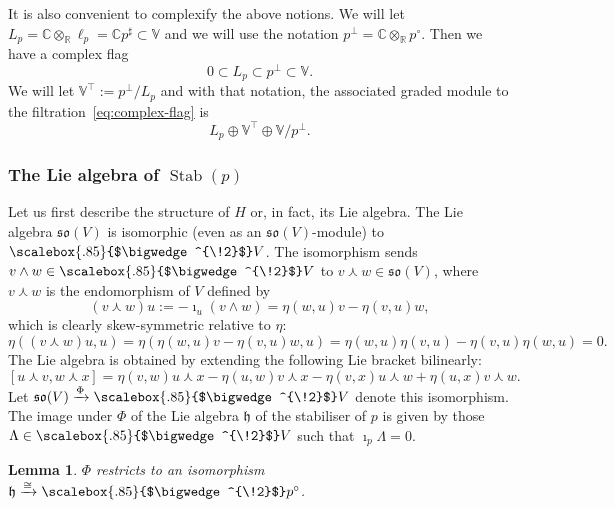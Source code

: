 \documentclass[11pt,reqno,a4paper,final]{amsart}
\newcommand\ext[1]{\scalebox{.85}{$\bigwedge^{\!#1}$}}
\theoremstyle{plain}
\newtheorem{lemma}{Lemma}
\theoremstyle{definition}
\newcommand{\h}{\mathfrak{h}}
\newcommand{\so}{\mathfrak{so}}
\newcommand{\Stab}{\operatorname{Stab}}
\newcommand{\VV}{\mathbb{V}}
\newcommand{\RR}{\mathbb{R}}
\newcommand{\CC}{\mathbb{C}}
\newcommand{\1}{\mathbb{1}}
\numberwithin{equation}{section}
\begin{document}
It is also convenient to complexify the above notions.  We will let
$L_p = \CC \otimes_\RR \ell_p = \CC p^\sharp \subset \VV$ and we will use
the notation $p^\perp = \CC \otimes_\RR p^\circ$.  Then we have a complex
flag
\begin{equation}
  \label{eq:complex-flag}
  0 \subset L_p \subset p^\perp \subset \VV.
\end{equation}
We will let $\VV^\top := p^\perp/L_p$ and with that notation, the
associated graded module to the filtration~\eqref{eq:complex-flag} is
\begin{equation}
  L_p \oplus \VV^\top \oplus \VV/p^\perp.
\end{equation}

\subsubsection{The Lie algebra of $\Stab(p)$}
\label{sec:lie-algebra-stabp}

Let us first describe the structure of $H$ or, in fact, its Lie
algebra. The Lie algebra $\so(V)$ is isomorphic (even as an
$\so(V)$-module) to $\ext{2}V$.  The isomorphism sends
$v \wedge w \in \ext{2}V$ to $v \curlywedge w \in \so(V)$, where
$v\curlywedge w$ is the endomorphism of $V$ defined by
\begin{equation}
  \label{eq:curlywedge}
  (v \curlywedge w) u := -\imath_u (v \wedge w) =\eta(w,u) v -  \eta(v,u) w,
\end{equation}
which is clearly skew-symmetric relative to $\eta$:
\begin{equation}
  \eta((v\curlywedge w)u, u)  = \eta(\eta(w,u) v -  \eta(v,u) w,u) =
  \eta(w,u)\eta(v,u) - \eta(v,u)\eta(w,u) = 0.
\end{equation}
The Lie algebra is obtained by extending the following Lie bracket
bilinearly:
\begin{equation}
  \label{eq:so-brackets}
  [u \curlywedge v, w \curlywedge x] = \eta(v,w) u \curlywedge x -
  \eta(u,w) v \curlywedge x - \eta(v,x) u \curlywedge w +
  \eta(u,x) v \curlywedge w.
\end{equation}
Let $\so(V) \xrightarrow{\Phi}\ext{2}V$ denote this isomorphism.  The image
under $\Phi$ of the Lie algebra $\h$ of the stabiliser of $p$ is given
by those $\Lambda \in \ext{2}V$ such that $\imath_p \Lambda = 0$.

\begin{lemma}
  \label{lem:stabp-in-sov}
  $\Phi$ restricts to an isomorphism $\h \xrightarrow{\cong} \ext{2}p^\circ$.
\end{lemma}
\end{document}
